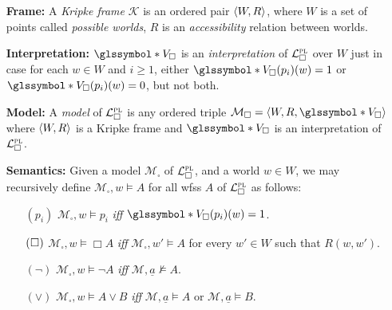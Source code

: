 \documentclass[a4paper, 11pt]{article} %
\newcommand{\g}{\glssymbol*}%
\begin{document}
\begin{enumerate}[leftmargin=1.2in,labelsep=.15in] %
\item[\bf Frame:] A \textit{Kripke frame} $\mathcal{K}$ is an ordered pair $\langle W,R\rangle$, where $W$ is a set of points called \textit{possible worlds}, $R$ is an \textit{accessibility} relation between worlds.
\item[\bf Interpretation:] $\g{V}_\square$ is an \textit{interpretation} of $\mathcal{L}^{\textsc{pl}}_\square$ over $W$ just in case for each $w\in W$ and $i\geq1$, either $\g{V}_\square(p_i)(w)=1$ or $\g{V}_\square(p_i)(w)=0$, but not both.
\item[\bf Model:] A \textit{model} of $\mathcal{L}^{\textsc{pl}}_\square$ is any ordered triple $\mathcal{M}_\square=\tuple{W,R,\g{V}_\square}$ where $\langle W,R\rangle$ is a Kripke frame and $\g{V}_\square$ is an interpretation of $\mathcal{L}^{\textsc{pl}}_\square$.
\item[\bf Semantics:] Given a model $\mathcal{M}_\square$ of $\mathcal{L}^{\textsc{pl}}_\square$, and a world $w\in W$, we may recursively define $\mathcal{M}_\square,w\vDash A$ for all wfss $A$ of $\mathcal{L}^{\textsc{pl}}_\square$ as follows:
\begin{small}
\begin{itemize}[leftmargin=.36in]
\item[$(p_i)$] $\mathcal{M}_\square,w\vDash  p_i$ \textit{iff} $\g{V}_\square(p_i)(w)=1$.
\item[$(\hspace{.3pt}\Box\hspace{.3pt})$] $\mathcal{M}_\square,w\vDash  \Box A$ \textit{iff} $\mathcal{M}_\square,w'\vDash A$ for every $w'\in W$ such that $R(w,w')$.
\item[$(\neg)$] $\mathcal{M}_\square,w\vDash  \neg A$ \textit{iff} $\mathcal{M},\underline{a}\nvDash A$.
\item[$(\vee)$] $\mathcal{M}_\square,w\vDash  A\vee B$ \textit{iff} $\mathcal{M},\underline{a}\vDash  A$ or $\mathcal{M},\underline{a}\vDash  B$.

\end{itemize}
\end{small}
\end{enumerate}
\end{document}
